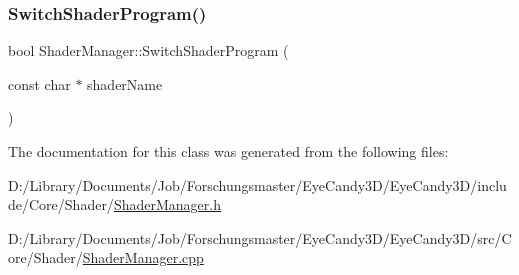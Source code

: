 \mbox{\label{classngl_1_1_shader_manager_a54765d52e0c26eea3677037a291252ea}} 
\subsubsection{\texorpdfstring{Switch\+Shader\+Program()}{SwitchShaderProgram()}}
{\footnotesize\ttfamily bool Shader\+Manager\+::\+Switch\+Shader\+Program (\begin{DoxyParamCaption}\item[{const char $\ast$}]{shader\+Name }\end{DoxyParamCaption})}



The documentation for this class was generated from the following files\+:\begin{DoxyCompactItemize}
\item 
D\+:/\+Library/\+Documents/\+Job/\+Forschungsmaster/\+Eye\+Candy3\+D/\+Eye\+Candy3\+D/include/\+Core/\+Shader/\mbox{\hyperlink{_shader_manager_8h}{Shader\+Manager.\+h}}\item 
D\+:/\+Library/\+Documents/\+Job/\+Forschungsmaster/\+Eye\+Candy3\+D/\+Eye\+Candy3\+D/src/\+Core/\+Shader/\mbox{\hyperlink{_shader_manager_8cpp}{Shader\+Manager.\+cpp}}\end{DoxyCompactItemize}
